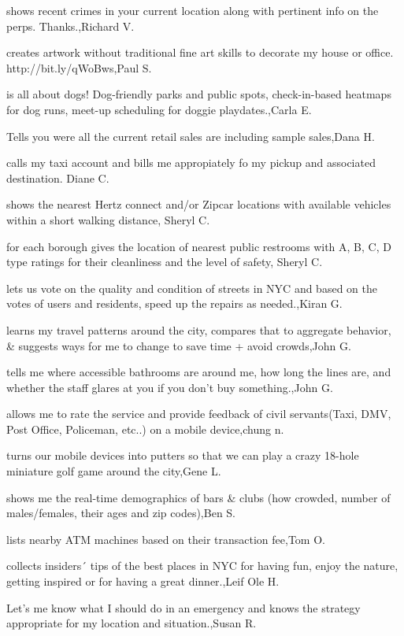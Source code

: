 \documentclass{article}
\begin{document}
shows recent crimes in your current location along with pertinent info on the perps.  Thanks.,Richard V.

creates artwork without traditional fine art skills to decorate my house or office. http://bit.ly/qWoBws,Paul S.

is all about dogs! Dog-friendly parks and public spots, check-in-based heatmaps for dog runs, meet-up scheduling for doggie playdates.,Carla E.

Tells you were all the current retail sales are including sample sales,Dana H.

calls my taxi account and bills me appropiately fo my pickup and associated destination.  Diane C.

shows the nearest Hertz connect and/or Zipcar locations with available vehicles within a short walking distance, Sheryl C.

for each borough gives the location of nearest public restrooms with A, B, C, D type ratings for their cleanliness and the level of safety, Sheryl C.

lets us vote on the quality and condition of streets in NYC and based on the votes of users and residents, speed up the repairs as needed.,Kiran G.

learns my travel patterns around the city, compares that to aggregate behavior, \& suggests ways for me to change to save time + avoid crowds,John G.

tells me where accessible bathrooms are around me, how long the lines are, and whether the staff glares at you if you don't buy something.,John G.

allows me to rate the service and provide feedback of civil servants(Taxi, DMV, Post Office, Policeman, etc..) on a mobile device,chung n.

turns our mobile devices into putters so that we can play a crazy 18-hole miniature golf game around the city,Gene L.

shows me the real-time demographics of bars \& clubs (how crowded, number of males/females, their ages and zip codes),Ben  S.

lists nearby ATM machines based on their transaction fee,Tom O.

collects insiders´ tips of the best places in NYC for having fun, enjoy the nature, getting inspired or for having a great dinner.,Leif Ole H.

Let's me know what I should do in an emergency and knows the strategy appropriate for my location and situation.,Susan R.
\end{document}
